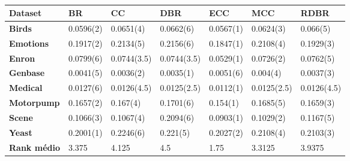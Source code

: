 \begin{table}[h]
\begin{tabular}{lllllll}
\hline
\textbf{Dataset}    & \textbf{BR} & \textbf{CC} & \textbf{DBR} & \textbf{ECC} & \textbf{MCC} & \textbf{RDBR} \\ \hline
\textbf{Birds}      & 0.0596(2)   & 0.0651(4)   & 0.0662(6)    & 0.0567(1)    & 0.0624(3)    & 0.066(5)      \\
\textbf{Emotions}   & 0.1917(2)   & 0.2134(5)   & 0.2156(6)    & 0.1847(1)    & 0.2108(4)    & 0.1929(3)     \\
\textbf{Enron}      & 0.0799(6)   & 0.0744(3.5) & 0.0744(3.5)  & 0.0529(1)    & 0.0726(2)    & 0.0762(5)     \\
\textbf{Genbase}    & 0.0041(5)   & 0.0036(2)   & 0.0035(1)    & 0.0051(6)    & 0.004(4)     & 0.0037(3)     \\
\textbf{Medical}    & 0.0127(6)   & 0.0126(4.5) & 0.0125(2.5)  & 0.0112(1)    & 0.0125(2.5)  & 0.0126(4.5)   \\
\textbf{Motorpump}  & 0.1657(2)   & 0.167(4)    & 0.1701(6)    & 0.154(1)     & 0.1685(5)    & 0.1659(3)     \\
\textbf{Scene}      & 0.1066(3)   & 0.1067(4)   & 0.2094(6)    & 0.0903(1)    & 0.1029(2)    & 0.1167(5)     \\
\textbf{Yeast}      & 0.2001(1)   & 0.2246(6)   & 0.221(5)     & 0.2027(2)    & 0.2108(4)    & 0.2103(3)     \\ \hline
\textbf{Rank médio} & 3.375       & 4.125       & 4.5          & 1.75         & 3.3125       & 3.9375        \\ \hline
\end{tabular}
\caption{}
\label{tab:HLsvm}
\end{table}